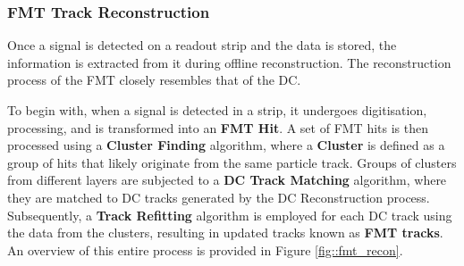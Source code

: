 \subsubsection{FMT Track Reconstruction}
\label{sssec::fmt_track_reconstruction}
    Once a signal is detected on a readout strip and the data is stored, the information is extracted from it during offline reconstruction.
    The reconstruction process of the FMT closely resembles that of the DC.

    To begin with, when a signal is detected in a strip, it undergoes digitisation, processing, and is transformed into an \textbf{FMT Hit}.
    A set of FMT hits is then processed using a \textbf{Cluster Finding} algorithm, where a \textbf{Cluster} is defined as a group of hits that likely originate from the same particle track.
    Groups of clusters from different layers are subjected to a \textbf{DC Track Matching} algorithm, where they are matched to DC tracks generated by the DC Reconstruction process.
    Subsequently, a \textbf{Track Refitting} algorithm is employed for each DC track using the data from the clusters, resulting in updated tracks known as \textbf{FMT tracks}.
    An overview of this entire process is provided in Figure \ref{fig::fmt_recon}.
